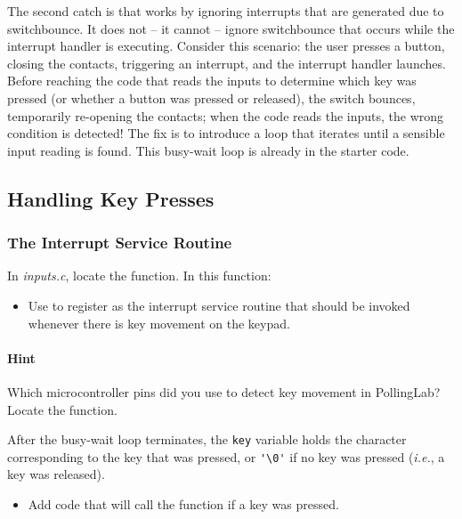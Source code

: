 The second catch is that  works by ignoring interrupts that are generated due to switchbounce.
It does not -- it cannot -- ignore switchbounce that occurs while the interrupt handler is executing.
Consider this scenario: the user presses a button, closing the contacts, triggering an interrupt, and the interrupt handler launches.
Before reaching the code that reads the inputs to determine which key was pressed (or whether a button was pressed or released), the switch bounces, temporarily re-opening the contacts;
when the code reads the inputs, the wrong condition is detected!
The fix is to introduce a loop that iterates until a sensible input reading is found.
This busy-wait loop is already in the starter code.


\subsection{Handling Key Presses}

\subsubsection{The Interrupt Service Routine}

In \textit{inputs.c}, locate the  function.
In this function:
\begin{itemize}
    \item Use  to register  as the interrupt service routine that should be invoked whenever there is key movement on the keypad.
\end{itemize}

\paragraph{Hint} Which microcontroller pins did you use to detect key movement in PollingLab? \\

Locate the  function.

After the busy-wait loop terminates, the \lstinline{key} variable holds the character corresponding to the key that was pressed, or \lstinline{'\0'} if no key was pressed (\textit{i.e.}, a key was released).
\begin{itemize}
    \item Add code that will call the  function if a key was pressed.
\end{itemize}

